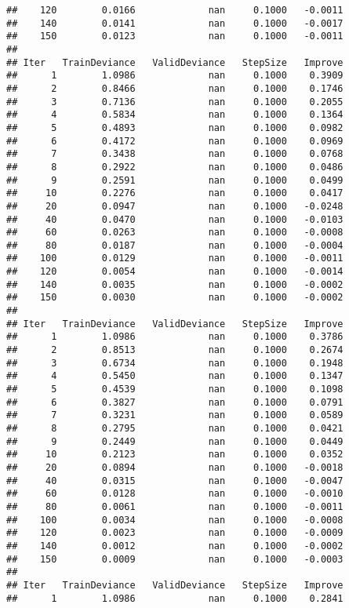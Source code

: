 \documentclass[
]{article}
\begin{document}
\begin{verbatim}
##    120        0.0166             nan     0.1000   -0.0011
##    140        0.0141             nan     0.1000   -0.0017
##    150        0.0123             nan     0.1000   -0.0011
## 
## Iter   TrainDeviance   ValidDeviance   StepSize   Improve
##      1        1.0986             nan     0.1000    0.3909
##      2        0.8466             nan     0.1000    0.1746
##      3        0.7136             nan     0.1000    0.2055
##      4        0.5834             nan     0.1000    0.1364
##      5        0.4893             nan     0.1000    0.0982
##      6        0.4172             nan     0.1000    0.0969
##      7        0.3438             nan     0.1000    0.0768
##      8        0.2922             nan     0.1000    0.0486
##      9        0.2591             nan     0.1000    0.0499
##     10        0.2276             nan     0.1000    0.0417
##     20        0.0947             nan     0.1000   -0.0248
##     40        0.0470             nan     0.1000   -0.0103
##     60        0.0263             nan     0.1000   -0.0008
##     80        0.0187             nan     0.1000   -0.0004
##    100        0.0129             nan     0.1000   -0.0011
##    120        0.0054             nan     0.1000   -0.0014
##    140        0.0035             nan     0.1000   -0.0002
##    150        0.0030             nan     0.1000   -0.0002
## 
## Iter   TrainDeviance   ValidDeviance   StepSize   Improve
##      1        1.0986             nan     0.1000    0.3786
##      2        0.8513             nan     0.1000    0.2674
##      3        0.6734             nan     0.1000    0.1948
##      4        0.5450             nan     0.1000    0.1347
##      5        0.4539             nan     0.1000    0.1098
##      6        0.3827             nan     0.1000    0.0791
##      7        0.3231             nan     0.1000    0.0589
##      8        0.2795             nan     0.1000    0.0421
##      9        0.2449             nan     0.1000    0.0449
##     10        0.2123             nan     0.1000    0.0352
##     20        0.0894             nan     0.1000   -0.0018
##     40        0.0315             nan     0.1000   -0.0047
##     60        0.0128             nan     0.1000   -0.0010
##     80        0.0061             nan     0.1000   -0.0011
##    100        0.0034             nan     0.1000   -0.0008
##    120        0.0023             nan     0.1000   -0.0009
##    140        0.0012             nan     0.1000   -0.0002
##    150        0.0009             nan     0.1000   -0.0003
## 
## Iter   TrainDeviance   ValidDeviance   StepSize   Improve
##      1        1.0986             nan     0.1000    0.2841

\end{verbatim}
\end{document}
